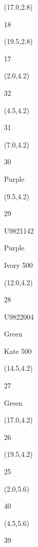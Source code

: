 \documentclass[a4paper]{article}
\newcommand{\myseat}[5]{%
\vspace{-0.1cm} \hspace{-0.5cm}
\parbox[t][2.2cm][t]{3.5cm}{%
\small #1 %
\begin{description}
\vspace{-0.1cm}
\item [ID:] #2
\vspace{-0.1cm}
\item [Team:] #3 \normalsize
\vspace{-0.1cm}
\item \normalsize #4 #5
\vspace{-0.1cm}
\end{description}
}
}
\begin{document}
\begin{CJK}{UTF8}{cyberbit}
\begin{textblock}{2.5}(17.0,2.8)
\textblockcolor{}
\myseat{18}{}{}{}{}
\end{textblock}

\begin{textblock}{2.5}(19.5,2.8)
\textblockcolor{}
\myseat{17}{}{}{}{}
\end{textblock}


\begin{textblock}{2.5}(2.0,4.2)
\textblockcolor{}
\myseat{32}{}{}{}{}
\end{textblock}

\begin{textblock}{2.5}(4.5,4.2)
\textblockcolor{}
\myseat{31}{}{}{}{}
\end{textblock}

\begin{textblock}{2.5}(7.0,4.2)
\myseat{30}{}{Purple}{}{}
\end{textblock}

\begin{textblock}{2.5}(9.5,4.2)
\myseat{29}{U9821142}{Purple}{Ivory}{500}
\end{textblock}

\begin{textblock}{2.5}(12.0,4.2)
\myseat{28}{U9822004}{Green}{Kate}{500}
\end{textblock}

\begin{textblock}{2.5}(14.5,4.2)
\myseat{27}{}{Green}{}{}
\end{textblock}

\begin{textblock}{2.5}(17.0,4.2)
\textblockcolor{}
\myseat{26}{}{}{}{}
\end{textblock}

\begin{textblock}{2.5}(19.5,4.2)
\textblockcolor{}
\myseat{25}{}{}{}{}
\end{textblock}


\begin{textblock}{2.5}(2.0,5.6)
\textblockcolor{}
\myseat{40}{}{}{}{}
\end{textblock}

\begin{textblock}{2.5}(4.5,5.6)
\textblockcolor{}
\myseat{39}{}{}{}{}
\end{textblock}


\end{CJK}
\end{document}
